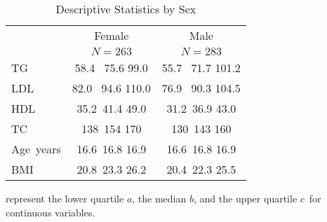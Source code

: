 \begin{table}[!tbp]
\caption{Descriptive Statistics by Sex\label{summary}} 
\begin{center}
\begin{tabular}{lcc}
\hline\hline
\multicolumn{1}{l}{}&\multicolumn{1}{c}{Female}&\multicolumn{1}{c}{Male}\tabularnewline
&\multicolumn{1}{c}{{\scriptsize $N=263$}}&\multicolumn{1}{c}{{\scriptsize $N=283$}}\tabularnewline
\hline
TG&{\scriptsize  58.4~}{ 75.6 }{\scriptsize  99.0} &{\scriptsize  55.7~}{ 71.7 }{\scriptsize 101.2} \tabularnewline
LDL&{\scriptsize  82.0~}{ 94.6 }{\scriptsize 110.0} &{\scriptsize  76.9~}{ 90.3 }{\scriptsize 104.5} \tabularnewline
HDL&{\scriptsize 35.2~}{41.4 }{\scriptsize 49.0} &{\scriptsize 31.2~}{36.9 }{\scriptsize 43.0} \tabularnewline
TC&{\scriptsize 138~}{154 }{\scriptsize 170} &{\scriptsize 130~}{143 }{\scriptsize 160} \tabularnewline
Age~\hfill\tiny{years}&{\scriptsize 16.6~}{16.8 }{\scriptsize 16.9} &{\scriptsize 16.6~}{16.8 }{\scriptsize 16.9} \tabularnewline
BMI&{\scriptsize 20.8~}{23.3 }{\scriptsize 26.2} &{\scriptsize 20.4~}{22.3 }{\scriptsize 25.5} \tabularnewline
\hline
\end{tabular}\end{center}

 represent the lower quartile $a$, the median $b$, and the upper quartile $c$\ for continuous variables.\end{table}
